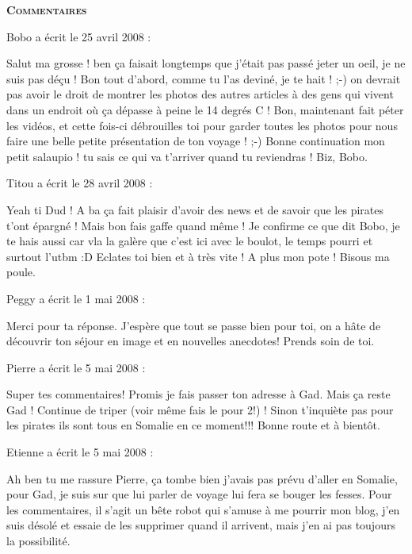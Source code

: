 \bigskip
\textbf{\textsc{Commentaires}}

\medskip
Bobo a écrit le 25 avril 2008 :
\begin{displayquote}
Salut ma grosse ! ben ça faisait longtemps que j'était pas passé jeter un oeil, je ne suis pas déçu !
Bon tout d'abord, comme tu l'as deviné, je te hait ! ;-) on devrait pas avoir le droit de montrer les photos des autres articles à des gens qui vivent dans un endroit où ça dépasse à peine le 14 degrés C !
Bon, maintenant fait péter les vidéos, et cette fois-ci débrouilles toi pour garder toutes les photos pour nous faire une belle petite présentation de ton voyage ! ;-)
Bonne continuation mon petit salaupio ! tu sais ce qui va t'arriver quand tu reviendras !
Biz, Bobo.
\end{displayquote}

\medskip
Titou a écrit le 28 avril 2008 :
\begin{displayquote}
Yeah ti Dud !
A ba ça fait plaisir d'avoir des news et de savoir que les pirates t'ont épargné ! Mais bon fais gaffe quand même !
Je confirme ce que dit Bobo, je te hais aussi car vla la galère que c'est ici avec le boulot, le temps pourri et surtout l'utbm :D Eclates toi bien et à très vite !
A plus mon pote !
Bisous ma poule.
\end{displayquote}

\medskip
Peggy a écrit le 1 mai 2008 :
\begin{displayquote}
Merci pour ta réponse. J'espère que tout se passe bien pour toi, on a hâte de découvrir ton séjour en image et en nouvelles anecdotes!
Prends soin de toi.
\end{displayquote}

\medskip
Pierre a écrit le 5 mai 2008 :
\begin{displayquote}
Super tes commentaires!
Promis je fais passer ton adresse à Gad.
Mais ça reste Gad !
Continue de triper (voir même fais le pour 2!) !
Sinon t'inquiète pas pour les pirates ils sont tous en Somalie en ce moment!!!
Bonne route et à bientôt.
\end{displayquote}

\medskip
Etienne a écrit le 5 mai 2008 :
\begin{displayquote}
Ah ben tu me rassure Pierre, ça tombe bien j'avais pas prévu d'aller en Somalie, pour Gad, je suis sur que lui parler de voyage lui fera se bouger les fesses.
Pour les commentaires, il s'agit un bête robot qui s'amuse à me pourrir mon blog, j'en suis désolé et essaie de les supprimer quand il arrivent, mais j'en ai pas toujours la possibilité.
\end{displayquote}

